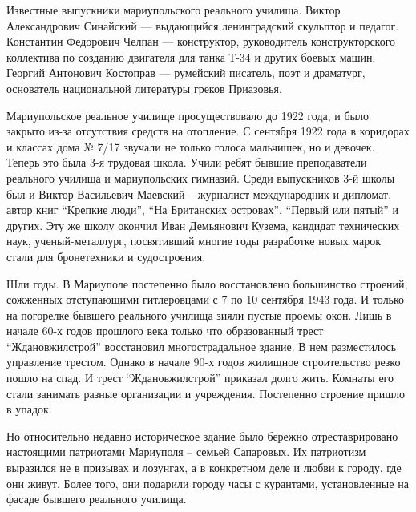 Известные выпускники мариупольского реального училища. Виктор Александрович
Синайский — выдающийся ленинградский скульптор и педагог. Константин Федорович
Челпан — конструктор,  руководитель конструкторского коллектива по созданию
двигателя  для танка Т-34 и других боевых машин. Георгий Антонович Костоправ —
румейский писатель, поэт и драматург, основатель национальной литературы греков
Приазовья.

Мариупольское реальное училище просуществовало до 1922 года, и было закрыто
из-за отсутствия средств на отопление. С сентября 1922 года в коридорах и
классах дома № 7/17 звучали не только голоса мальчишек, но и девочек. Теперь
это была 3-я трудовая школа.  Учили ребят бывшие преподаватели реального
училища и мариупольских гимназий. Среди выпускников 3-й школы был и Виктор
Васильевич Маевский – журналист-международник и дипломат, автор книг \enquote{Крепкие
люди}, \enquote{На Британских островах}, \enquote{Первый или пятый} и других. Эту же школу
окончил Иван Демьянович Кузема, кандидат технических наук, ученый-металлург,
посвятивший многие годы разработке новых марок стали для бронетехники и
судостроения.


Шли годы. В Мариуполе постепенно было восстановлено большинство строений,
сожженных отступающими гитлеровцами  с 7  по 10 сентября 1943 года. И только на
погорелке бывшего реального училища зияли пустые проемы окон. Лишь  в начале
60-х годов прошлого века   только что образованный  трест \enquote{Ждановжилстрой}
восстановил многострадальное здание.  В нем  разместилось управление трестом.
Однако  в начале 90-х годов жилищное строительство резко пошло на спад. И трест
\enquote{Ждановжилстрой} приказал долго жить. Комнаты его стали занимать разные
организации и учреждения. Постепенно строение пришло в упадок.

Но относительно недавно историческое здание было бережно отреставрировано
настоящими  патриотами  Мариуполя – семьей Сапаровых. Их патриотизм выразился
не в призывах и лозунгах, а в конкретном деле и любви к городу, где они живут.
Более того, они подарили городу часы с курантами, установленные на фасаде
бывшего реального училища.
